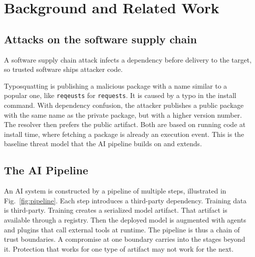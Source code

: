 \documentclass[conference]{IEEEtran}
\begin{document}
\section{Background and Related Work}
\label{sec:background}

\subsection{Attacks on the software supply chain}
\label{sec:sw-supply-chain}

A software supply chain attack infects a dependency before delivery to the target, so trusted software ships attacker code.

Typosquatting is publishing a malicious package with a name similar to a popular one, like \texttt{reqeusts} for \texttt{requests}. It is caused by a typo in the install command. With dependency confusion, the attacker publishes a public package with the same name as the private package, but with a higher version number. The resolver then prefers the public artifact. Both are based on running code at install time, where fetching a package is already an execution event. This is the baseline threat model that the AI pipeline builds on and extends.

\subsection{The AI Pipeline}
\label{sec:ai-pipeline}

An AI system is constructed by a pipeline of multiple steps, illustrated in Fig.~\ref{fig:pipeline}. Each step introduces a third-party dependency. Training data is third-party. Training creates a serialized model artifact. That artifact is available through a registry. Then the deployed model is augmented with agents and plugins that call external tools at runtime. The pipeline is thus a chain of trust boundaries. A compromise at one boundary carries into the stages beyond it. Protection that works for one type of artifact may not work for the next.
\end{document}
